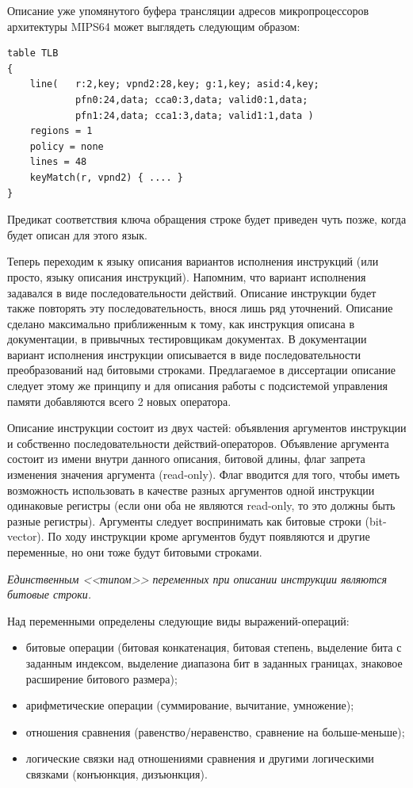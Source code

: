 \documentclass[14pt]{extreport}
\begin{document}
Описание уже упомянутого буфера трансляции адресов микропроцессоров архитектуры MIPS64 может выглядеть следующим образом:
\begin{verbatim}
table TLB
{
    line(   r:2,key; vpnd2:28,key; g:1,key; asid:4,key;
            pfn0:24,data; cca0:3,data; valid0:1,data;
            pfn1:24,data; cca1:3,data; valid1:1,data )
    regions = 1
    policy = none
    lines = 48
    keyMatch(r, vpnd2) { .... }
}
\end{verbatim}

Предикат соответствия ключа обращения строке будет приведен чуть позже, когда будет описан для этого язык.

Теперь переходим к языку описания вариантов исполнения инструкций (или просто, языку описания инструкций). Напомним, что вариант исполнения задавался в виде последовательности действий. Описание инструкции будет также повторять эту последовательность, внося лишь ряд уточнений. Описание сделано максимально приближенным к тому, как инструкция описана в документации, в привычных тестировщикам документах. В документации вариант исполнения инструкции описывается в виде последовательности преобразований над битовыми строками. Предлагаемое в диссертации описание следует этому же принципу и для описания работы с подсистемой управления памяти добавляются всего 2 новых оператора.

Описание инструкции состоит из двух частей: объявления аргументов инструкции и собственно последовательности действий-операторов. Объявление аргумента состоит из имени внутри данного описания, битовой длины, флаг запрета изменения значения аргумента (read-only). Флаг вводится для того, чтобы иметь возможность использовать в качестве разных аргументов одной инструкции одинаковые регистры (если они оба не являются read-only, то это должны быть разные регистры). Аргументы следует воспринимать как битовые строки (bit-vector). По ходу инструкции кроме аргументов будут появляются и другие переменные, но они тоже будут битовыми строками.

\emph{Единственным <<типом>> переменных при описании инструкции являются битовые строки.}

Над переменными определены следующие виды выражений-операций:
\begin{itemize}
    \item битовые операции (битовая конкатенация, битовая степень, выделение бита с заданным индексом, выделение диапазона бит в заданных границах, знаковое расширение битового размера);
    \item арифметические операции (суммирование, вычитание, умножение);
    \item отношения сравнения (равенство/неравенство, сравнение на больше-меньше);
    \item логические связки над отношениями сравнения и другими логическими связками (конъюнкция, дизъюнкция).
\end{itemize}
\end{document}
